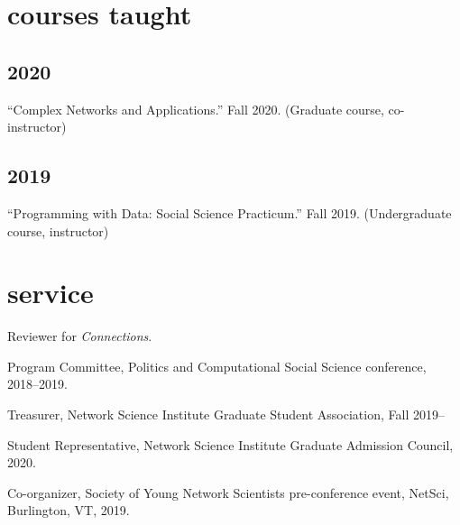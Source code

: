 \documentclass[11pt, letter]{article}
\begin{document}
\vspace{2mm}
\section{courses taught}
\subsection{2020}
\begin{hangparas}{.25in}{1}
``Complex Networks and Applications.'' Fall 2020. (Graduate course,
co-instructor)
\end{hangparas}
\vspace{1mm}

\subsection{2019}
\begin{hangparas}{.25in}{1}
``Programming with Data: Social Science Practicum.'' Fall 2019.
(Undergraduate course, instructor) \vspace{2mm}
\end{hangparas}


 \section{service}
 Reviewer for \textit{Connections}.

 Program Committee, Politics and Computational Social Science conference,
 2018--2019.

 Treasurer, Network Science Institute Graduate Student Association, Fall 2019--

 Student Representative, Network Science Institute Graduate Admission Council,
 2020.

 Co-organizer, Society of Young Network Scientists pre-conference event, NetSci,
 Burlington, VT, 2019.
\end{document}

